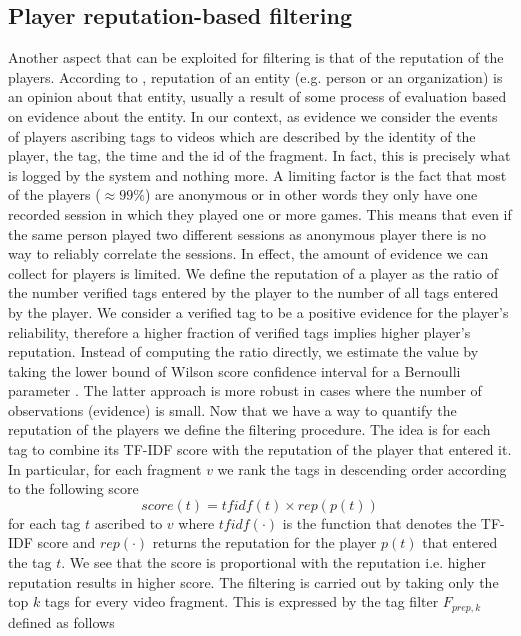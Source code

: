 \subsection{Player reputation-based filtering}
Another aspect that can be exploited for filtering is that of the reputation of the players. According to \cite{Farmer10}, reputation of an entity (e.g. person or an organization) is an opinion about that entity, usually a result of some process of evaluation based on evidence about the entity. In our context, as evidence we consider the events of players ascribing tags to videos which are described by the identity of the player, the tag, the time and the id of the fragment. In fact, this is precisely what is logged by the system and nothing more. A limiting factor is the fact that most of the players ($\approx 99\%$) are anonymous or in other words they only have one recorded session in which they played one or more games. This means that even if the same person played two different sessions as anonymous player there is no way to reliably correlate the sessions. In effect, the amount of evidence we can collect for players is limited.
We define the reputation of a player as the ratio of the number verified tags entered by the player to the number of all tags entered by the player. We consider a verified tag to be a positive evidence for the player's reliability, therefore a higher fraction of verified tags implies higher player's reputation. Instead of computing the ratio directly, we estimate the value by taking the lower bound of Wilson score confidence interval for a Bernoulli parameter \cite{citeulike:1060968,Wilson1927}. The latter approach is more robust in cases where the number of observations (evidence) is small. Now that we have a way to quantify the reputation of the players we define the filtering procedure. The idea is for each tag to combine its TF-IDF score with the reputation of the player that entered it. In particular, for each fragment $v$ we rank the tags in descending order according to the following score
\begin{equation}\label{rep-score}
	score(t) = tfidf(t) \times rep(p(t))
\end{equation}
for each tag $t$ ascribed to $v$ where $tfidf(\cdot)$ is the function that denotes the TF-IDF score and $rep(\cdot)$ returns the reputation for the player $p(t)$ that entered the tag $t$. We see that the score is proportional with the reputation i.e. higher reputation results in higher score.  The filtering is carried out by taking only the top $k$ tags for every video fragment. This is expressed by the tag filter $F_{prep,k}$ defined as follows
